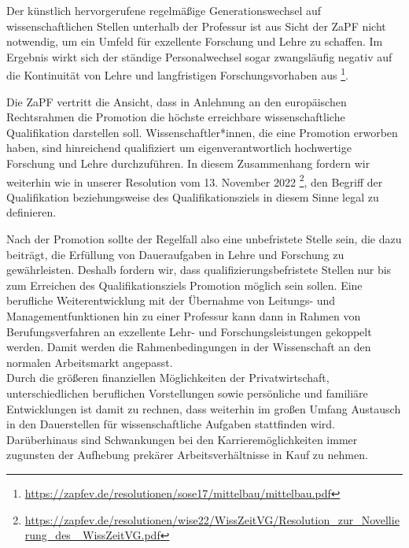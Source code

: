 \documentclass[DIV=calc]{scrartcl}
\begin{document}
Der künstlich hervorgerufene regelmäßige Generationswechsel auf wissenschaftlichen Stellen unterhalb der Professur ist aus Sicht der ZaPF nicht notwendig, um ein Umfeld für exzellente Forschung und Lehre 
zu schaffen. 
Im Ergebnis wirkt sich der ständige Personalwechsel sogar zwangsläufig negativ auf die Kontinuität von Lehre und langfristigen Forschungsvorhaben aus \footnote{\href{https://zapfev.de/resolutionen/sose17/mittelbau/mittelbau.pdf}{https://zapfev.de/resolutionen/sose17/mittelbau/mittelbau.pdf}}.

Die ZaPF vertritt die Ansicht, dass in Anlehnung an den europäischen Rechtsrahmen die Promotion die höchste erreichbare wissenschaftliche Qualifikation darstellen soll. Wissenschaftler*innen, die eine Promotion erworben haben, sind hinreichend qualifiziert um eigenverantwortlich hochwertige Forschung und Lehre durchzuführen. In diesem Zusammenhang  fordern wir weiterhin wie in unserer Resolution vom  13. November 2022 \footnote{\label{footnote1}\href{https://zapfev.de/resolutionen/wise22/WissZeitVG/Resolution_zur_Novellierung_des_WissZeitVG.pdf}{https://zapfev.de/resolutionen/wise22/WissZeitVG/Resolution\_zur\_Novellierung\_des\_ WissZeitVG.pdf}}, den Begriff der Qualifikation beziehungsweise des Qualifikationsziels in diesem Sinne legal zu definieren.

Nach der Promotion sollte der Regelfall also eine unbefristete Stelle sein, die dazu beiträgt, die Erfüllung von Daueraufgaben in Lehre und Forschung zu gewährleisten. 
Deshalb fordern wir, dass qualifizierungsbefristete Stellen  nur bis zum Erreichen des Qualifikationsziels Promotion möglich sein sollen.
Eine berufliche Weiterentwicklung mit der Übernahme von Leitungs- und Managementfunktionen hin zu einer Professur  kann dann in Rahmen von Berufungsverfahren an exzellente Lehr- und Forschungsleistungen gekoppelt werden.  Damit werden die Rahmenbedingungen in der Wissenschaft an den normalen Arbeitsmarkt angepasst.\\
Durch die größeren finanziellen Möglichkeiten der Privatwirtschaft, unterschiedlichen beruflichen Vorstellungen sowie persönliche und familiäre Entwicklungen ist damit zu rechnen, dass weiterhin im großen Umfang Austausch in den Dauerstellen für wissenschaftliche Aufgaben stattfinden wird. Darüberhinaus sind Schwankungen bei den Karrieremöglichkeiten immer zugunsten der Aufhebung prekärer Arbeitsverhältnisse in Kauf zu nehmen.
                
\end{document}
